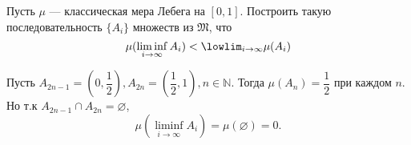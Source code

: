 \begin{task}{9}
Пусть $\mu$ --- классическая мера Лебега на $[0, 1]$. Построить такую последовательность $\{A_i\}$ множеств из $\mathfrak{M}$, что
$$ \mu(\liminf_{i \to \infty} A_i) < \lowlim_{i\to\infty} \mu(A_i) $$
\end{task}

\begin{solution}
Пусть $A_{2n-1} = \left(0, \dfrac{1}{2}\right), A_{2n} = \left(\dfrac{1}{2}, 1\right), n \in \mathbb{N}$. Тогда $\mu(A_n) = \dfrac{1}{2}$ при каждом $n$. Но т.к $A_{2n-1} \cap A_{2n} = \varnothing$, 
$$ \mu(\liminf_{i \to \infty} A_i) = \mu(\varnothing) = 0.$$
\end{solution}